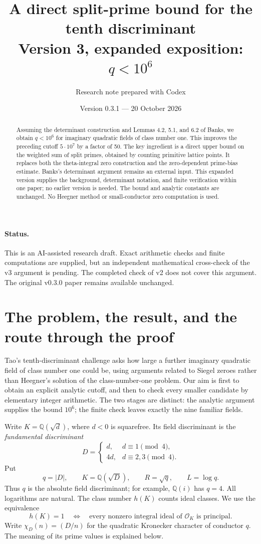 \documentclass[11pt]{article}
\title{A direct split-prime bound for the tenth discriminant\\
\large Version 3, expanded exposition: \(q<10^6\)}
\author{Research note prepared with Codex}
\date{Version 0.3.1 --- 20 October 2026}
\newcommand{\Q}{\mathbb Q}
\newcommand{\OK}{\mathcal O_K}
\begin{document}
\maketitle
\begin{abstract}
Assuming the determinant construction and Lemmas 4.2, 5.1, and 6.2 of
Banks, we obtain \(q<10^6\) for imaginary quadratic fields of class
number one. This improves the preceding cutoff \(5\cdot10^7\) by a
factor of 50. The key ingredient is a direct upper bound on the weighted
sum of split primes, obtained by counting primitive lattice points.
It replaces both the theta-integral zero construction and the
zero-dependent prime-bias estimate. Banks's determinant argument remains
an external input. This expanded version supplies the background,
determinant notation, and finite verification within one paper; no
earlier version is needed. The bound and analytic constants are unchanged.
No Heegner method or small-conductor zero computation is used.
\end{abstract}

\paragraph{Status.}
This is an AI-assisted research draft. Exact arithmetic checks and finite
computations are supplied, but an independent mathematical cross-check
of the v3 argument is pending. The completed check of v2 does not cover
this argument. The original v0.3.0 paper remains available unchanged.

\section{The problem, the result, and the route through the proof}

Tao's tenth-discriminant challenge \cite{tao} asks how large a further imaginary
quadratic field of class number one could be, using arguments related to
Siegel zeroes rather than Heegner's solution of the class-number-one
problem. Our aim is first to obtain an explicit analytic cutoff, and
then to check every smaller candidate by elementary integer arithmetic.
The two stages are distinct: the analytic argument supplies the bound
\(10^6\); the finite check leaves exactly the nine familiar fields.

Write \(K=\Q(\sqrt d)\), where \(d<0\) is squarefree. Its field
discriminant is the \emph{fundamental discriminant}
\[
 D=\begin{cases}
 d,&d\equiv1\pmod4,\\
 4d,&d\equiv2,3\pmod4.
 \end{cases}
\]
Put
\[
 q=|D|,\qquad K=\Q(\sqrt D),\qquad R=\sqrt q,\qquad L=\log q.
\]
Thus \(q\) is the absolute field discriminant; for example,
\(\Q(i)\) has \(q=4\). All logarithms are natural.
The class number \(h(K)\) counts ideal classes. We use the equivalence
\[
 h(K)=1
 \quad\Longleftrightarrow\quad
 \text{every nonzero integral ideal of \(\OK\) is principal}.
\]
Write \(\chi_D(n)=(D/n)\) for the quadratic Kronecker character of
conductor \(q\). The meaning of its prime values is explained below.
\end{document}
